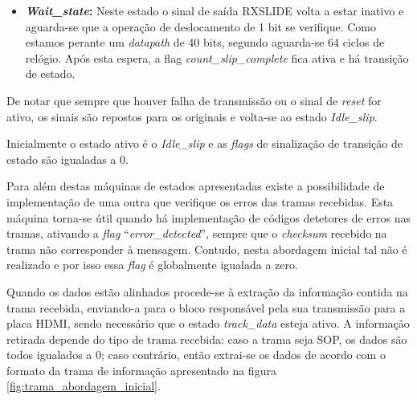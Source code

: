 \begin{enumerate}
\begin{itemize}
		\item \textbf{\textit{Wait\_state}:} Neste estado o sinal de saída RXSLIDE volta a estar inativo e aguarda-se que a operação de deslocamento de 1 bit se verifique. Como estamos perante um \textit{datapath} de 40 bits, segundo \cite{R011} aguarda-se 64 ciclos de relógio. Após esta espera, a flag \textit{count\_slip\_complete} fica ativa e há transição de estado.
	\end{itemize}
	
	De notar que sempre que houver falha de transmissão ou o sinal de \textit{reset} for ativo, os sinais são repostos para os originais e volta-se ao estado \textit{Idle\_slip}.
	
	
	Inicialmente o estado ativo é o {\textit{Idle\_slip} }e as \textit{flags} de sinalização de transição de estado são igualadas a 0.
	
\end{enumerate}

Para além destas máquinas de estados apresentadas existe a possibilidade de implementação de uma outra que verifique os erros das tramas recebidas. Esta máquina torna-se útil quando há implementação de códigos detetores de erros nas tramas, ativando a \textit{flag} ``\textit{error\_detected}'', sempre que o \textit{checksum} recebido na trama não corresponder à mensagem. Contudo, nesta abordagem inicial tal não é realizado e por isso essa \textit{flag} é globalmente igualada a zero.

Quando os dados estão alinhados procede-se à extração da informação contida na trama recebida, enviando-a para o bloco responsável pela sua transmissão para a placa HDMI, sendo necessário que o estado  \textit{track\_data} esteja ativo. A informação retirada depende do tipo de trama recebida: caso a trama seja SOP, os dados são todos igualados a 0; caso contrário, então extrai-se os dados de acordo com o formato da trama de informação apresentado na figura \ref{fig:trama_abordagem_inicial}.


%

